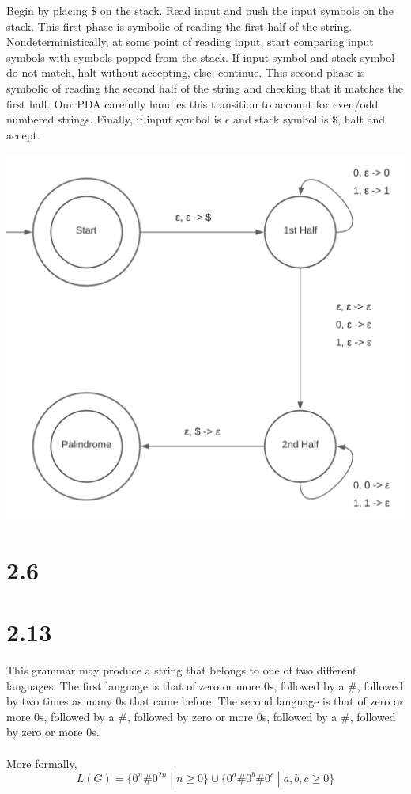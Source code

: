 \documentclass{article}
\begin{document}
Begin by placing $\$$ on the stack. Read input and push the input symbols on the stack. This first phase is symbolic of reading the first half of the string. Nondeterministically, at some point of reading input, start comparing input symbols with symbols popped from the stack. If input symbol and stack symbol do not match, halt without accepting, else, continue. This second phase is symbolic of reading the second half of the string and checking that it matches the first half. Our PDA carefully handles this transition to account for even/odd numbered strings. Finally, if input symbol is $\epsilon$ and stack symbol is $\$$, halt and accept. 

\includegraphics[scale=.65]{2.5.b.png}

\section*{2.6}

\section*{2.13}

This grammar may produce a string that belongs to one of two different languages. The first language is that of zero or more $0$s, followed by a $\#$, followed by two times as many $0$s that came before. The second language is that of zero or more $0$s, followed by a $\#$, followed by zero or more $0$s, followed by a $\#$, followed by zero or more $0$s.\\\\
More formally,
$$L(G) = \{ 0^n\#0^{2n} \; | \; n \geq 0 \} \cup  \{ 0^a\#0^b\#0^c \; | \; a,b,c \geq 0 \}$$
\end{document}
